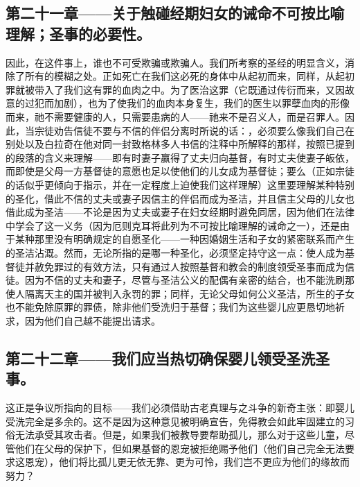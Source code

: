 
\subsection{第二十一章——关于触碰经期妇女的诫命不可按比喻理解；圣事的必要性。}

因此，在这件事上，谁也不可受欺骗或欺骗人。我们所考察的圣经的明显含义，消除了所有的模糊之处。正如死亡在我们这必死的身体中从起初而来，同样，从起初罪就被带入了我们这有罪的血肉之中。为了医治这罪（它既通过传衍而来，又因故意的过犯而加剧），也为了使我们的血肉本身复生，我们的医生以罪孽血肉的形像而来，祂不需要健康的人，只需要患病的人——祂来不是召义人，而是召罪人。因此，当宗徒劝告信徒不要与不信的伴侣分离时所说的话：，必须要么像我们自己在别处以及白拉奇在他对同一封致格林多人书信的注释中所解释的那样，按照已提到的段落的含义来理解——即有时妻子赢得了丈夫归向基督，有时丈夫使妻子皈依，而即使是父母一方基督徒的意愿也足以使他们的儿女成为基督徒；要么（正如宗徒的话似乎更倾向于指示，并在一定程度上迫使我们这样理解）这里要理解某种特别的圣化，借此不信的丈夫或妻子因信主的伴侣而成为圣洁，并且信主父母的儿女也借此成为圣洁——不论是因为丈夫或妻子在妇女经期时避免同居，因为他们在法律中学会了这一义务（因为厄则克耳将此列为不可按比喻理解的诫命之一），还是由于某种那里没有明确规定的自愿圣化——一种因婚姻生活和子女的紧密联系而产生的圣洁沾溉。然而，无论所指的是哪一种圣化，必须坚定持守这一点：使人成为基督徒并赦免罪过的有效方法，只有通过人按照基督和教会的制度领受圣事而成为信徒。因为不信的丈夫和妻子，尽管与圣洁公义的配偶有亲密的结合，也不能洗刷那使人隔离天主的国并被判入永罚的罪；同样，无论父母如何公义圣洁，所生的子女也不能免除原罪的罪债，除非他们受洗归于基督；我们为这些婴儿应更恳切地祈求，因为他们自己越不能提出请求。\par


\subsection{第二十二章——我们应当热切确保婴儿领受圣洗圣事。}

这正是争议所指向的目标——我们必须借助古老真理与之斗争的新奇主张：即婴儿受洗完全是多余的。这不是因为这种意见被明确宣告，免得教会如此牢固建立的习俗无法承受其攻击者。但是，如果我们被教导要帮助孤儿，那么对于这些儿童，尽管他们在父母的保护下，但如果基督的恩宠被拒绝赐予他们（他们自己完全无法要求这恩宠），他们将比孤儿更无依无靠、更为可怜，我们岂不更应为他们的缘故而努力？\par

